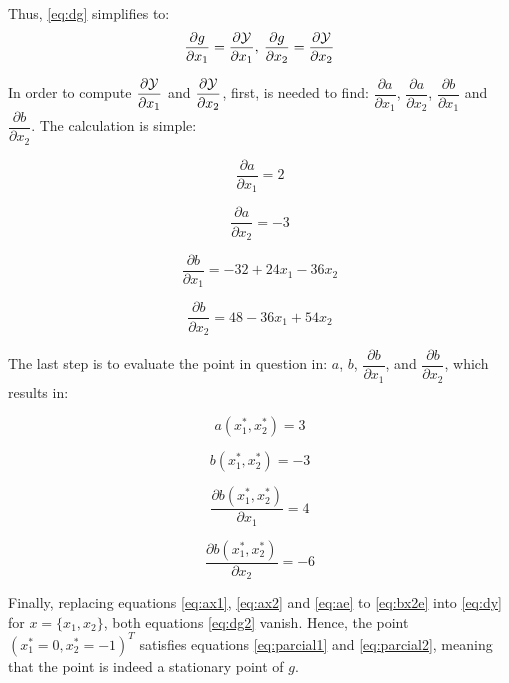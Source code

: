 \documentclass[18pt,a4paper]{article}
\begin{document}
\begin{enumerate}[a)]
			Thus, \eqref{eq:dg} simplifies to:
			\begin{equation}\label{eq:dg2}
				\dfrac{\partial g}{\partial x_1} = \dfrac{\partial{\cal Y}}{\partial x_1},\> \dfrac{\partial g}{\partial x_2} = \dfrac{\partial{\cal Y}}{\partial x_2}
			\end{equation} 
			
			In order to compute $\dfrac{\partial{\cal Y}}{\partial x_1}$ and $\dfrac{\partial{\cal Y}}{\partial x_2}$, first, is needed to find: $\dfrac{\partial{a}}{\partial x_1}$, $\dfrac{\partial{a}}{\partial x_2}$, $\dfrac{\partial{b}}{\partial x_1}$ and $\dfrac{\partial{b}}{\partial x_2}$. The calculation is simple:
			
			\begin{equation}\label{eq:ax1}
				\dfrac{\partial{a}}{\partial x_1} = 2
			\end{equation} 
	
			\begin{equation}\label{eq:ax2}
				\dfrac{\partial{a}}{\partial x_2} = -3
			\end{equation} 
			
			\begin{equation}\label{eq:bx1}
				\dfrac{\partial{b}}{\partial x_1} = -32 + 24x_1 - 36x_2
			\end{equation} 
			
			\begin{equation}\label{eq:bx1}
				\dfrac{\partial{b}}{\partial x_2} = 48 - 36x_1 + 54x_2
			\end{equation} 
			
			The last step is to evaluate the point in question in: $a$, $b$, $\dfrac{\partial{b}}{\partial x_1}$, and $\dfrac{\partial{b}}{\partial x_2}$, which results in:
			
			\begin{equation}\label{eq:ae}
				a(x_1^{*},x_2^{*}) = 3
			\end{equation}

			\begin{equation}\label{eq:be}
				b(x_1^{*},x_2^{*}) = -3
			\end{equation}
			
			\begin{equation}\label{eq:bx1e}
				\dfrac{\partial{b(x_1^{*},x_2^{*})}}{\partial x_1} = 4
			\end{equation}
			
			\begin{equation}\label{eq:bx2e}
				\dfrac{\partial{b(x_1^{*},x_2^{*})}}{\partial x_2} = -6
			\end{equation}
			
			Finally, replacing equations \eqref{eq:ax1}, \eqref{eq:ax2} and \eqref{eq:ae} to \eqref{eq:bx2e} into \eqref{eq:dy} for $x = \{x_1, x_2\}$, both equations \eqref{eq:dg2} vanish.
			Hence, the point $(x_1^{*} = 0, x_2^{*} = -1)^T$ satisfies equations \eqref{eq:parcial1} and \eqref{eq:parcial2}, meaning that the point is indeed a stationary point of $g$.  	
	\end{enumerate}
\end{document}
